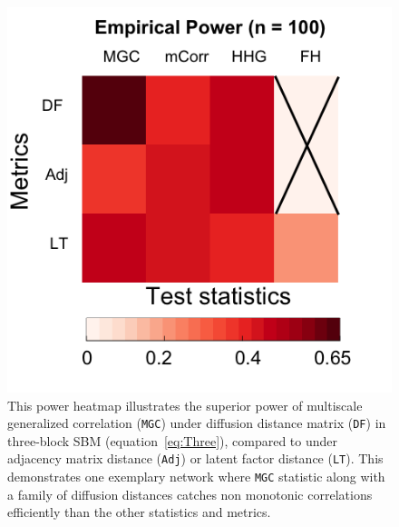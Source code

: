\documentclass[11pt]{article}
\theoremstyle{definition}
\begin{document}
\begin{figure}
	\centering
	\includegraphics[width=0.4\paperwidth, height=0.4\paperwidth]{../Figure/ThreeSBM_results_simple.png}
	\caption{This power heatmap illustrates the superior power of multiscale generalized correlation (\texttt{MGC}) under diffusion distance matrix (\texttt{DF}) in three-block SBM (equation~\ref{eq:Three}), compared to under adjacency matrix distance (\texttt{Adj}) or latent factor distance (\texttt{LT}). This demonstrates one exemplary network where \texttt{MGC} statistic along with a family of diffusion distances catches non monotonic correlations efficiently than the other statistics and metrics.}
	\label{fig:threeSBM}
\end{figure}
\end{document}
